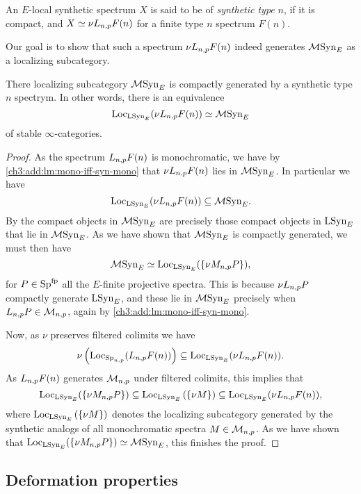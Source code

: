 \begin{definition}
    An $E$-local synthetic spectrum $X$ is said to be of \emph{synthetic type} $n$, if it is compact, and $X\simeq \nu L_{n,p} F(n)$ for a finite type $n$ spectrum $F(n)$. 
\end{definition}

Our goal is to show that such a spectrum $\nu L_{n,p} F(n)$ indeed generates $\mathcal{M}\mathrm{Syn}_{E}$ as a localizing subcategory. 

\begin{lemma}
    \label{ch3:add:monochromatic-synthetic-is-gen-by-type-n}
    There localizing subcategory $\mathcal{M}\mathrm{Syn}_{E}$ is compactly generated by a synthetic type $n$ spectrym. In other words, there is an equivalence 
    \[\operatorname{Loc}_{\mathrm{LSyn}_{E}}(\nu L_{n,p} F(n))\simeq \mathcal{M}\mathrm{Syn}_{E}\]
    of stable $\infty$-categories. 
\end{lemma}
\begin{proof}
    As the spectrum $L_{n,p} F(n)$ is monochromatic, we have by \cref{ch3:add:lm:mono-iff-syn-mono} that $\nu L_{n,p} F(n)$ lies in $\mathcal{M}\mathrm{Syn}_{E}$. In particular we have 
    \[\operatorname{Loc}_{\mathrm{LSyn}_{E}}(\nu L_{n,p} F(n))\subseteq \mathcal{M}\mathrm{Syn}_{E}.\]
    By \cite[2.2]{neeman_1992} the compact objects in $\mathcal{M}\mathrm{Syn}_{E}$ are precisely those compact objects in $\mathrm{LSyn}_{E}$ that lie in $\mathcal{M}\mathrm{Syn}_{E}$. As we have shown that $\mathcal{M}\mathrm{Syn}_{E}$ is compactly generated, we must then have 
    \[\mathcal{M}\mathrm{Syn}_{E} \simeq \operatorname{Loc}_{\mathrm{LSyn}_{E}}(\{\nu M_{n,p} P\}),\]
    for $P \in \mathrm{Sp}^{\mathrm{fp}}$ all the $E$-finite projective spectra. This is because $\nu L_{n,p} P$ compactly generate $\mathrm{LSyn}_{E}$, and these lie in $\mathcal{M}\mathrm{Syn}_{E}$ precisely when $L_{n,p} P\in \mathcal{M}_{n,p}$, again by \cref{ch3:add:lm:mono-iff-syn-mono}. 

    Now, as $\nu$ preserves filtered colimits we have 
    \[\nu \left(\operatorname{Loc}_{\mathrm{Sp}_{n,p}}(L_{n,p} F(n))\right)\subseteq \operatorname{Loc}_{\mathrm{LSyn}_{E}}(\nu L_{n,p} F(n)).\]
    As $L_{n,p} F(n)$ generates $\mathcal{M}_{n,p}$ under filtered colimits, this implies that 
    \[\operatorname{Loc}_{\mathrm{LSyn}_{E}}(\{\nu M_{n,p} P\})\subseteq \operatorname{Loc}_{\mathrm{LSyn}_{E}}\left(\{\nu M\}\right) \subseteq \operatorname{Loc}_{\mathrm{LSyn}_{E}}(\nu L_{n,p} F(n)),\]
    where $\operatorname{Loc}_{\mathrm{LSyn}_{E}}\left(\{\nu M\}\right)$ denotes the localizing subcategory generated by the synthetic analogs of all monochromatic spectra $M\in \mathcal{M}_{n,p}$. As we have shown that $\operatorname{Loc}_{\mathrm{LSyn}_{E}}(\{\nu M_{n,p} P\})\simeq \mathcal{M}\mathrm{Syn}_{E}$, this finishes the proof. 
\end{proof}



\subsection{Deformation properties}

